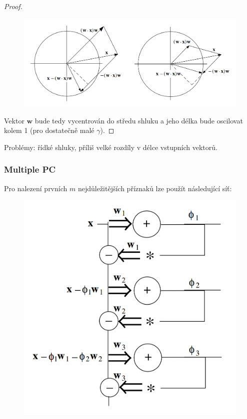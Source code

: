 \documentclass[11pt]{report} %
\renewcommand{\vec}[1]{\mathbf{#1}}
\numberwithin{equation}{section}
\begin{document}
\begin{proof}
\begin{figure}[h]
	\centering
	\includegraphics[scale=0.7]{img/oja2.png}
\end{figure}


Vektor $\vec{w}$ bude tedy vycentrován do středu shluku a jeho délka bude oscilovat kolem 1 (pro dostatečně malé $\gamma$). 
\end{proof}

Problémy: řídké shluky, příliš velké rozdíly v délce vstupních vektorů.

\subsubsection{Multiple PC}
Pro nalezení prvních $m$ nejdůležitějších příznaků lze použít následující síť:
\begin{figure}[h]
	\centering
	\includegraphics[scale=1]{img/multipca.png}
\end{figure}
\end{document}
